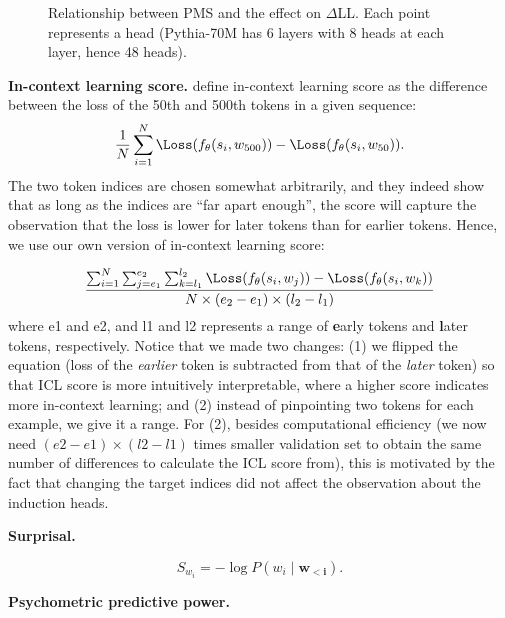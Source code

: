 \begin{figure*}[t]
    \hspace{-30pt}
    
    \vspace{-20pt}
    \caption{Relationship between PMS and the effect on $\Delta$LL. Each point represents a head (Pythia-70M has 6 layers with 8 heads at each layer, hence 48 heads).}
    \label{fig:ppp_and_icl}
\end{figure*}

\textbf{In-context learning score.}
\citet{olsson2022context} define in-context learning score as the difference between the loss of the 50th and 500th tokens in a given sequence:
\begin{equation}    
    \frac{1}{N}\sum_{i=1}^{N}\Loss(f_\theta(s_i, w_{500})) - \Loss(f_\theta(s_i, w_{50})).
    \end{equation}
The two token indices are chosen somewhat arbitrarily, and they indeed show that as long as the indices are ``far apart enough'', the score will capture the observation that the loss is lower for later tokens than for earlier tokens. Hence, we use our own version of in-context learning score:

\begin{equation}
\frac{
\sum_{i=1}^{N}
    \sum_{j=e_1}^{e_2} \sum_{k=l_1}^{l_2} \Loss(f_\theta(s_i, w_{j})) - \Loss(f_\theta(s_i, w_{k}))}{N\times(e_2-e_1)\times(l_2-l_1)}
\end{equation}
where e1 and e2, and l1 and l2 represents a range of \textbf{e}arly tokens and \textbf{l}ater tokens, respectively.
Notice that we made two changes: (1) we flipped the equation (loss of the \textit{earlier} token is subtracted from that of the \textit{later} token) so that ICL score is more intuitively interpretable, where a higher score indicates more in-context learning; and (2) instead of pinpointing two tokens for each example, we give it a range. For (2), besides computational efficiency (we now need $(e2-e1)\times(l2-l1)$ times smaller validation set to obtain the same number of differences to calculate the ICL score from), this is motivated by the fact that changing the target indices did not affect the observation about the induction heads.

\noindent\textbf{Surprisal.}

\begin{equation}\label{eq:surp}
    S_{w_i} = -\log P(w_i \mid \bm{w_{<i}}).
\end{equation}

\noindent\textbf{Psychometric predictive power.} 